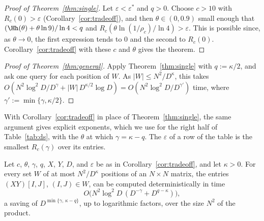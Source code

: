 \begin{proof}[Proof of Theorem~\ref{thm:single}]
Let $\varepsilon<\varepsilon^*$ and $q>0$. Choose $c>10$ with $R_c(0)>\varepsilon$ (Corollary~\ref{cor:tradeoff}), and then $\theta\in(0,0.9)$ small enough that $(\Hh(\theta)+\theta\ln9)/\ln4<q$ and $R_c(\theta\ln(1/\rho_c)/\ln4)>\varepsilon$. This is possible since, as $\theta\to0$, the first expression tends to $0$ and the second to $R_c(0)$. Corollary~\ref{cor:tradeoff} with these $c$ and $\theta$ gives the theorem.
\end{proof}

\begin{proof}[Proof of Theorem~\ref{thm:general}]
Apply Theorem~\ref{thm:single} with $q:=\kappa/2$, and ask one query for each position of $W$. As $|W|\le N^2/D^{\kappa}$, this takes $O(N^2\log^2\!D/D^{\gamma}+|W|\,D^{\kappa/2}\log D)=O(N^2\log^2\!D/D^{\gamma'})$ time, where $\gamma':=\min\{\gamma,\kappa/2\}$.
\end{proof}

With Corollary~\ref{cor:tradeoff} in place of Theorem~\ref{thm:single}, the same argument gives explicit exponents, which we use for the right half of Table~\ref{tab:ds}, with the $\theta$ at which $\gamma=\kappa-q$. The $\varepsilon$ of a row of the table is the smallest $R_c(\gamma)$ over its entries.

\begin{corollary}\label{cor:range}
Let $c$, $\theta$, $\gamma$, $q$, $X$, $Y$, $D$, and $\varepsilon$ be as in Corollary~\ref{cor:tradeoff}, and let $\kappa>0$. For every set $W$ of at most $N^2/D^{\kappa}$ positions of an $N\times N$ matrix, the entries $(XY)[I,J]$, $(I,J)\in W$, can be computed deterministically in time
\[
O\big(N^2\log^2\!D\,(D^{-\gamma}+D^{q-\kappa})\big),
\]
a saving of $D^{\min\{\gamma,\,\kappa-q\}}$, up to logarithmic factors, over the size $N^2$ of the product.
\end{corollary}

